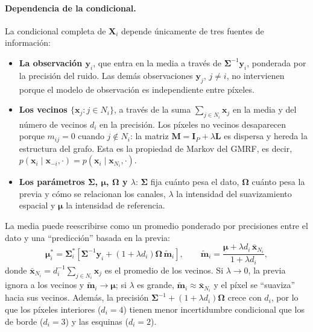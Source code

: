 \documentclass[11pt,a4paper]{article}
\begin{document}
\paragraph{Dependencia de la condicional.}
La condicional completa de $\boldsymbol{X}_i$ depende únicamente de tres fuentes de información:
\begin{itemize}
\item \textbf{La observación $\boldsymbol{y}_i$}, que entra en la media a través de $\mathbf{\Sigma}^{-1}\boldsymbol{y}_i$, ponderada por la precisión del ruido. Las demás observaciones $\boldsymbol{y}_j$, $j\neq i$, no intervienen porque el modelo de observación es independiente entre píxeles.
\item \textbf{Los vecinos $\{\boldsymbol{x}_j: j\in N_i\}$}, a través de la suma $\sum_{j\in N_i}\boldsymbol{x}_j$ en la media y del número de vecinos $d_i$ en la precisión. Los píxeles no vecinos desaparecen porque $m_{ij}=0$ cuando $j\notin N_i$: la matriz $\mathbf{M}=\mathbf{I}_P+\lambda\mathbf{L}$ es dispersa y hereda la estructura del grafo. Esta es la propiedad de Markov del GMRF, es decir, $p(\boldsymbol{x}_i\mid\boldsymbol{x}_{-i},\cdot)=p(\boldsymbol{x}_i\mid\boldsymbol{x}_{N_i},\cdot)$.
\item \textbf{Los parámetros $\mathbf{\Sigma}$, $\boldsymbol{\mu}$, $\mathbf{\Omega}$ y $\lambda$}: $\mathbf{\Sigma}$ fija cuánto pesa el dato, $\mathbf{\Omega}$ cuánto pesa la previa y cómo se relacionan los canales, $\lambda$ la intensidad del suavizamiento espacial y $\boldsymbol{\mu}$ la intensidad de referencia.
\end{itemize}
La media puede reescribirse como un promedio ponderado por precisiones entre el dato y una ``predicción'' basada en la previa:
\[
\boldsymbol{\mu}_i^{*}=\mathbf{\Sigma}_i^{*}\left[\mathbf{\Sigma}^{-1}\boldsymbol{y}_i+(1+\lambda d_i)\mathbf{\Omega}\,\tilde{\boldsymbol{m}}_i\right],
\qquad
\tilde{\boldsymbol{m}}_i=\frac{\boldsymbol{\mu}+\lambda d_i\,\bar{\boldsymbol{x}}_{N_i}}{1+\lambda d_i},
\]
donde $\bar{\boldsymbol{x}}_{N_i}=d_i^{-1}\sum_{j\in N_i}\boldsymbol{x}_j$ es el promedio de los vecinos. Si $\lambda\to0$, la previa ignora a los vecinos y $\tilde{\boldsymbol{m}}_i\to\boldsymbol{\mu}$; si $\lambda$ es grande, $\tilde{\boldsymbol{m}}_i\approx\bar{\boldsymbol{x}}_{N_i}$ y el píxel se ``suaviza'' hacia sus vecinos. Además, la precisión $\mathbf{\Sigma}^{-1}+(1+\lambda d_i)\mathbf{\Omega}$ crece con $d_i$, por lo que los píxeles interiores ($d_i=4$) tienen menor incertidumbre condicional que los de borde ($d_i=3$) y las esquinas ($d_i=2$).
\end{document}
